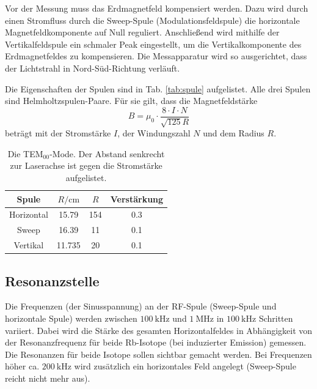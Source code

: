 Vor der Messung muss das Erdmagnetfeld kompensiert werden.
Dazu wird durch einen Stromfluss durch die Sweep-Spule (Modulationsfeldspule) die horizontale Magnetfeldkomponente auf Null reguliert. Anschließend wird mithilfe der Vertikalfeldspule ein schmaler Peak eingestellt, um die Vertikalkomponente des Erdmagnetfeldes zu kompensieren. Die Messapparatur wird so ausgerichtet, dass der Lichtstrahl in Nord-Süd-Richtung verläuft. \cite{V21}

Die Eigenschaften der Spulen sind in Tab. \ref{tab:spule} aufgelistet. 
Alle drei Spulen sind Helmholtzspulen-Paare. Für sie gilt, dass die Magnetfeldstärke 
\begin{equation*}
    B = \mu_0 \cdot \frac{8 \cdot I \cdot N}{\sqrt{125} R}
\end{equation*}
beträgt mit der Stromstärke $I$, der Windungszahl $N$ und dem Radius $R$. 

\begin{table}\caption{Die TEM$_{00}$-Mode. Der Abstand senkrecht zur Laserachse ist gegen die Stromstärke aufgelistet.}
    \label{tab:mode0}
    \centering
    \begin{tabular}{c | S[] S[] S[]} 
    \toprule
    {Spule} & {$R / \si{\centi\metre}$} & {$R$} & {Verstärkung} \\
    \midrule
    Horizontal & 15.79 & 154 & 0.3 \\
    Sweep & 16.39 & 11 & 0.1 \\ 
    Vertikal & 11.735 & 20 & 0.1 \\ 
    \bottomrule
\end{tabular}\end{table}

\subsection{Resonanzstelle}
Die Frequenzen (der Sinusspannung) an der RF-Spule (Sweep-Spule und horizontale Spule) werden zwischen $\SI{100}{\kilo\hertz}$ und $\SI{1}{\mega\hertz}$ in $\SI{100}{\kilo\hertz}$ Schritten variiert. Dabei wird die Stärke des gesamten Horizontalfeldes in Abhängigkeit von der Resonanzfrequenz für beide Rb-Isotope (bei induzierter Emission) gemessen. Die Resonanzen für beide Isotope sollen sichtbar gemacht werden. Bei Frequenzen höher  ca. $\SI{200}{\kilo\hertz}$ wird zusätzlich ein horizontales Feld angelegt (Sweep-Spule reicht nicht mehr aus).


